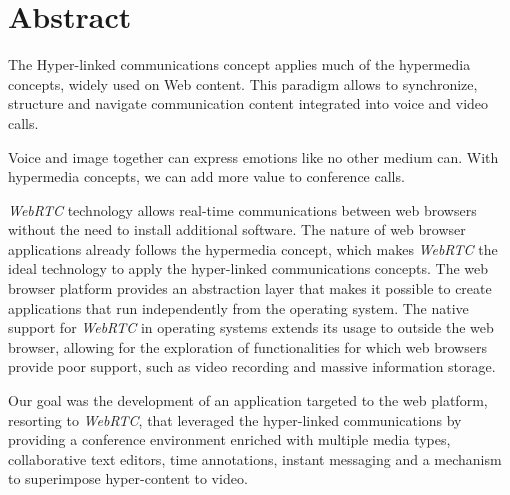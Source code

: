 \chapter*{Abstract}


The Hyper-linked communications concept applies much of the hypermedia concepts, widely used on Web content. This paradigm allows to synchronize, structure and navigate communication content integrated into voice and video calls.

Voice and image together can express emotions like no other medium can. With hypermedia concepts, we can add more value to conference calls.

\emph{WebRTC} technology allows real-time communications between web browsers without the need to install additional software. The nature of web browser applications already follows the hypermedia concept, which makes \emph{WebRTC} the ideal technology to apply the hyper-linked communications concepts.
The web browser platform provides an abstraction layer that makes it possible to create applications that run independently from the operating system.
The native support for \emph{WebRTC} in operating systems extends its usage to outside the web browser, allowing for the exploration of functionalities for which web browsers provide poor support, such as video recording and massive information storage.



Our goal was the development of an application targeted to the web platform, resorting to \emph{WebRTC}, that leveraged the hyper-linked communications by providing a conference environment enriched with multiple media types, collaborative text editors, time annotations, instant messaging and a mechanism to superimpose hyper-content to video.


